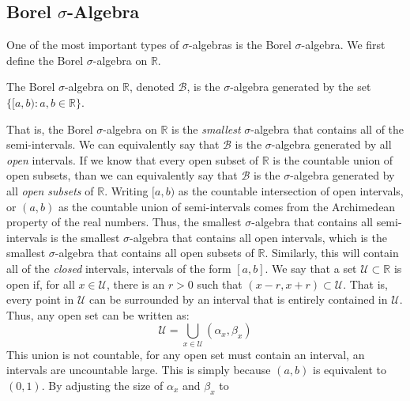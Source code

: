     \subsection{Borel \texorpdfstring{$\sigma$}{Sigma}-Algebra}
        One of the most important types of $\sigma$-algebras
        is the Borel $\sigma$-algebra. We first define the
        Borel $\sigma$-algebra on $\mathbb{R}$.
        \begin{definition}
            The Borel $\sigma$-algebra on $\mathbb{R}$, denoted
            $\mathcal{B}$, is the $\sigma$-algebra generated
            by the set $\{[a,b):a,b\in\mathbb{R}\}$.
        \end{definition}
        That is, the Borel $\sigma$-algebra on $\mathbb{R}$ is
        the \textit{smallest} $\sigma$-algebra that contains
        all of the semi-intervals. We can equivalently say that
        $\mathcal{B}$ is the $\sigma$-algebra generated by all
        \textit{open} intervals. If we know that every open
        subset of $\mathbb{R}$ is the countable union of open
        subsets, than we can equivalently say that
        $\mathcal{B}$ is the $\sigma$-algebra generated by all
        \textit{open subsets} of $\mathbb{R}$. Writing $[a,b)$
        as the countable intersection of open intervals, or
        $(a,b)$ as the countable union of semi-intervals comes
        from the Archimedean property of the real numbers.
        Thus, the smallest $\sigma$-algebra that contains all
        semi-intervals is the smallest $\sigma$-algebra that
        contains all open intervals, which
        is the smallest $\sigma$-algebra that contains all open
        subsets of $\mathbb{R}$. Similarly, this will contain all
        of the \textit{closed} intervals, intervals of the form
        $[a,b]$. We say that a set $\mathcal{U}\subset\mathbb{R}$
        is open if, for all $x\in\mathcal{U}$, there is an $r>0$
        such that $(x-r,x+r)\subset\mathcal{U}$. That is, every
        point in $\mathcal{U}$ can be surrounded by an interval
        that is entirely contained in $\mathcal{U}$. Thus, any
        open set can be written as:
        \begin{equation}
            \mathcal{U}=
                \bigcup_{x\in\mathcal{U}}(\alpha_{x},\beta_{x})
        \end{equation}
        This union is not countable, for any open set must
        contain an interval, an intervals are uncountable large.
        This is simply because $(a,b)$ is equivalent to $(0,1)$.
        By adjusting the size of $\alpha_{x}$ and $\beta_{x}$ to
